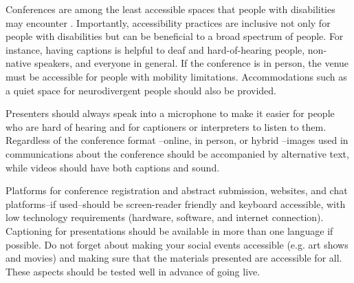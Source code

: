 \documentclass[10pt,letterpaper]{article}
\begin{document}
Conferences are among the least accessible spaces that people with disabilities may encounter \cite{priceAccessImaginedConstruction2009}.
Importantly, accessibility practices are inclusive not only for people with disabilities but can be beneficial to a broad spectrum of people. For instance, having captions is helpful to deaf and hard-of-hearing people, non-native speakers, and everyone in general. 
If the conference is in person, the venue must be accessible for people with mobility limitations. 
Accommodations such as a quiet space for neurodivergent people should also be provided.

Presenters should always speak into a microphone to make it easier for people who are hard of hearing and for captioners or interpreters to listen to them. 
Regardless of the conference format --online, in person, or hybrid --images used in communications about the conference should be accompanied by alternative text, while videos should have both captions and sound. 

Platforms for conference registration and abstract submission, websites, and chat platforms--if used--should be screen-reader friendly and keyboard accessible, with low technology requirements (hardware, software, and internet connection). 
Captioning for presentations should be available in more than one language if possible.
Do not forget about making your social events accessible (e.g. art shows and movies) and making sure that the materials presented are accessible for all. 
These aspects should be tested well in advance of going live.  
\end{document}
